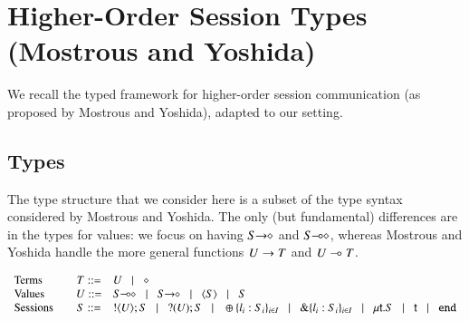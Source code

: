 
\newcommand{\Proc}{\ensuremath{\diamond}}

\section{Higher-Order Session Types (Mostrous and Yoshida)}

We recall the typed framework for higher-order session communication
(as proposed by Mostrous and Yoshida), adapted to our setting.

\subsection{Types}
The type structure that we consider here is a subset of the type syntax considered by Mostrous and Yoshida.
The only (but fundamental) differences are in the types for values: we focus on having 
$S\!\! \rightarrow\!\! \diamond$ and $S\!\! \multimap\!\! \diamond$, whereas Mostrous and Yoshida handle the more general functions $U \rightarrow T$ and 
$U \multimap T$.

\[
	\begin{array}{lcl}
		\text{Terms} & T ::= & U  \bnfbar  \Proc\\
		\text{Values} & U ::= & \lhot{S} \bnfbar \shot{S} \bnfbar \chtype{S} \bnfbar S \\
		\text{Sessions} \quad & S ::= &  \btout{U} S \bnfbar \btinp{U} S
		\bnfbar		\btsel{l_i:S_i}_{i \in I} \bnfbar \btbra{l_i:S_i}_{i \in I} \bnfbar \trec{t}{S} \bnfbar \vart{t}  \bnfbar \tinact 
	\end{array}
\]

